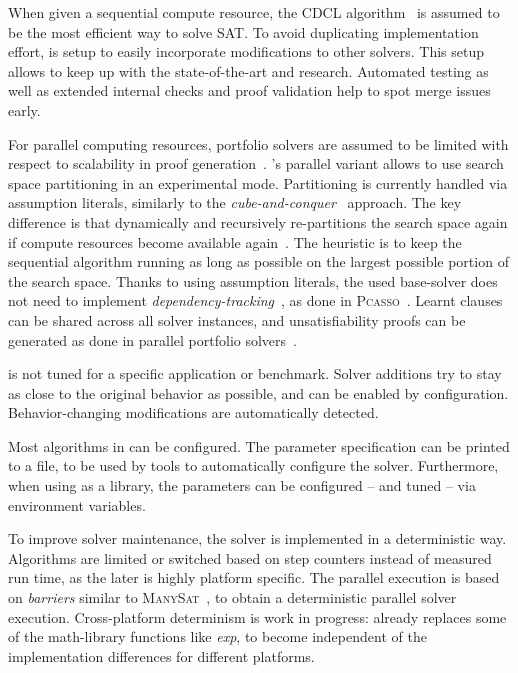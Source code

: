 \documentclass[conference]{IEEEtran}
\begin{document}
When given a sequential compute resource, the CDCL algorithm~\cite{Marques-Silva:1996} is assumed to be the most efficient way to solve SAT.
To avoid duplicating implementation effort, \mergesat is setup to easily incorporate modifications to other solvers.
This setup allows to keep up with the state-of-the-art and research.
Automated testing as well as extended internal checks and proof validation help to spot merge issues early.

For parallel computing resources, portfolio solvers are assumed to be limited with respect to scalability in proof generation~\cite{resolution-barriers}. \mergesat's parallel variant allows to use search space partitioning in an experimental mode. 
Partitioning is currently handled via assumption literals, similarly to the \emph{cube-and-conquer}~\cite{cubeNconquer} approach.
The key difference is that \mergesat dynamically and recursively re-partitions the search space again if compute resources become available again~\cite{HyvarinenJN:2006,Miterative-splitting}.
The heuristic is to keep the sequential algorithm running as long as possible on the largest possible portion of the search space.
Thanks to using assumption literals, the used base-solver does not need to implement \emph{dependency-tracking}~\cite{LantiM:2013}, as done in \textsc{Pcasso}~\cite{pcasso2014}.
Learnt clauses can be shared across all solver instances, and unsatisfiability proofs can be generated as done in parallel portfolio solvers~\cite{HeuleMP:2014}.
% 

\mergesat is not tuned for a specific application or benchmark.
Solver additions try to stay as close to the original behavior as possible, and can be enabled by configuration.
Behavior-changing modifications are automatically detected.

Most algorithms in \mergesat can be configured.
The parameter specification can be printed to a file, to be used by tools to automatically configure the solver.
Furthermore, when using \mergesat as a library, the parameters can be configured -- and tuned -- via environment variables.

To improve solver maintenance, the solver is implemented in a deterministic way.
Algorithms are limited or switched based on step counters instead of measured run time, as the later is highly platform specific.
The parallel execution is based on \emph{barriers} similar to \textsc{ManySat}~\cite{HamadiJ:2009}, to obtain a deterministic parallel solver execution.
Cross-platform determinism is work in progress: \mergesat already replaces some of the math-library functions like \emph{exp}, to become independent of the implementation differences for different platforms.
\end{document}
